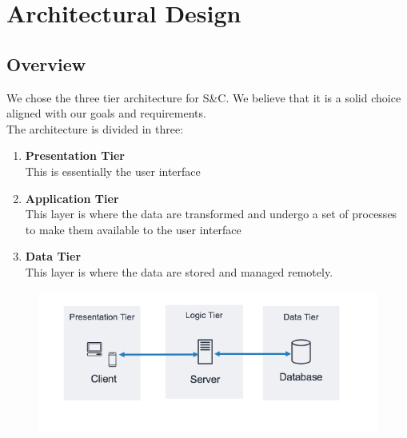 \section{Architectural Design}
\subsection{Overview}
We chose the three tier architecture for S\&C. We believe that it is a solid choice aligned with our goals and requirements. \\
The architecture is divided in three:
\begin{enumerate}
    \item\textbf{Presentation Tier} \\
    This is essentially the user interface
    \item\textbf{ Application Tier} \\
    This layer is where the data are transformed and undergo a set of processes to make them available to the user interface
    \item\textbf{Data Tier} \\
    This layer is where the data are stored and managed remotely.
\end{enumerate}
\begin{figure}[h!]
        \centering  \includegraphics[width=1\textwidth]{DD/Images/aws.png}
        \label{fig:CompleteStudentProfile}
\end{figure}


